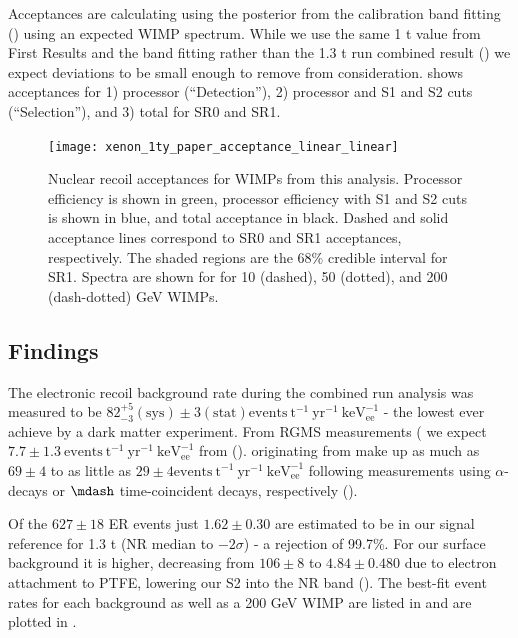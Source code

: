 Acceptances are calculating using the posterior from the calibration band fitting () using an expected
WIMP spectrum.  While we use the same 1 t value from First Results and the band fitting rather than the 1.3 t run combined
result () we expect deviations to be small enough to remove from
consideration.   shows acceptances for 1) processor (``Detection''), 2) processor and S1 and
S2 cuts (``Selection''), and 3) total for SR0 and SR1.

\begin{figure}
\centering
\texttt{[image: xenon\_1ty\_paper\_acceptance\_linear\_linear]}
\caption{Nuclear recoil acceptances for WIMPs from this analysis.  Processor efficiency is shown in green, processor efficiency with S1
and S2 cuts is shown in blue, and total acceptance in black.  Dashed and solid acceptance lines correspond to SR0 and SR1 acceptances,
respectively.  The shaded regions are the 68\% credible interval for SR1.  Spectra are shown for for 10 (dashed), 50 (dotted), and
200 (dash-dotted) GeV WIMPs.}
\label{fig:dark_matter_results_acceptances}
\end{figure}



\subsection{Findings}
\label{subsec:dark_matter_results_background}
The electronic recoil background rate during the combined run analysis was measured to be
$82_{-3}^{+5} (\mathrm{sys}) \pm 3 (\mathrm{stat}) \mathrm{events\ t^{-1}\ yr^{-1}\ keV_{ee}^{-1}}$ - the lowest ever achieve by a dark
matter experiment.  From RGMS measurements ( we expect
$7.7 \pm 1.3\ \mathrm{events\ t^{-1}\ yr^{-1}\ keV_{ee}^{-1}}$ from  
().  \betadecays originating from  make up as much as $69 \pm 4$ to as
little as $29 \pm 4  \mathrm{events\ t^{-1}\ yr^{-1}\ keV_{ee}^{-1}}$ following measurements using  $\alpha$-decays or
$\mdash$ time-coincident decays, respectively ().

Of the $627 \pm 18$ ER events just $1.62 \pm 0.30$ are estimated to be in our signal reference for 1.3 t (NR median to
$-2 \sigma$) - a rejection of 99.7\%.  For our surface background it is higher, decreasing from $106 \pm 8$ to $4.84 \pm 0.480$ due to
electron attachment to PTFE, lowering our S2 into the NR band ().  The best-fit event rates
for each background as well as a 200 GeV WIMP are listed in  and are plotted in
.

